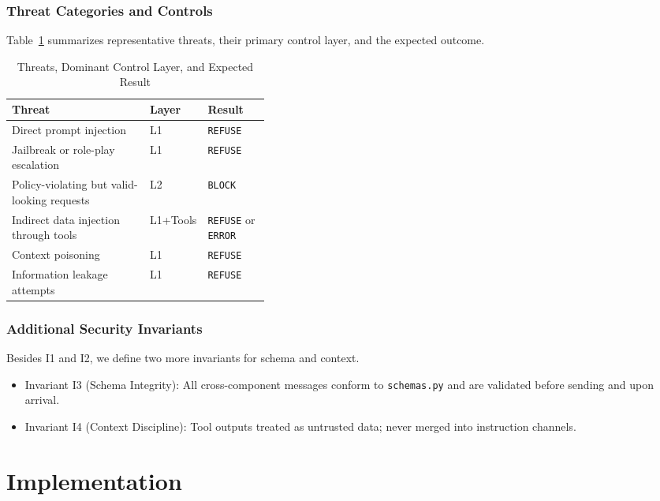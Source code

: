 ﻿\documentclass[conference]{IEEEtran}
\begin{document}
\subsubsection{Threat Categories and Controls}
Table~\ref{tab:threat-controls} summarizes representative threats, their
primary control layer, and the expected outcome.

\begin{table}[!htbp]
\centering
\caption{Threats, Dominant Control Layer, and Expected Result}
\label{tab:threat-controls}
\small
\begin{tabularx}{\linewidth}{>{\raggedright\arraybackslash}X >{\centering\arraybackslash}p{0.14\linewidth} >{\raggedright\arraybackslash}p{0.24\linewidth}}
\toprule
\textbf{Threat} & \textbf{Layer} & \textbf{Result} \\
\midrule
Direct prompt injection & L1 & \texttt{REFUSE} \\
Jailbreak or role-play escalation & L1 & \texttt{REFUSE} \\
Policy-violating but valid-looking requests & L2 & \texttt{BLOCK} \\
Indirect data injection through tools & L1+Tools & \texttt{REFUSE} or \texttt{ERROR} \\
Context poisoning & L1 & \texttt{REFUSE} \\
Information leakage attempts & L1 & \texttt{REFUSE} \\
\bottomrule
\end{tabularx}
\end{table}

\subsubsection{Additional Security Invariants}
Besides I1 and I2, we define two more invariants for schema and context.

\begin{itemize}
    \item Invariant I3 (Schema Integrity): All cross-component messages conform to \texttt{schemas.py} and are validated before sending and upon arrival.
    \item Invariant I4 (Context Discipline): Tool outputs treated as untrusted data; never merged into instruction channels.
\end{itemize}

\section{Implementation}
\end{document}
